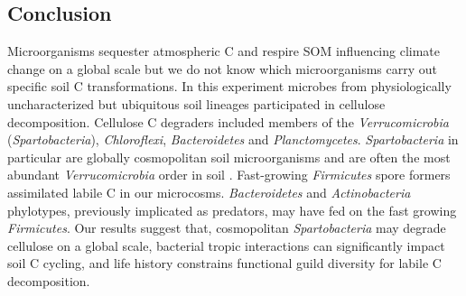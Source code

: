 \subsection{Conclusion} 
Microorganisms sequester atmospheric C and respire SOM influencing climate
change on a global scale but we do not know which microorganisms carry out
specific soil C transformations. In this experiment microbes from
physiologically uncharacterized but ubiquitous soil lineages participated in
cellulose decomposition. Cellulose C degraders included members of the
\textit{Verrucomicrobia} (\textit{Spartobacteria}), \textit{Chloroflexi},
\textit{Bacteroidetes} and \textit{Planctomycetes}. \textit{Spartobacteria} in
particular are globally cosmopolitan soil microorganisms and are often the most
abundant \textit{Verrucomicrobia} order in soil \citep{Bergmann_2011}.
Fast-growing \textit{Firmicutes} spore formers assimilated labile C in our
microcosms. \textit{Bacteroidetes} and \textit{Actinobacteria} phylotypes,
previously implicated as predators, may have fed on the fast growing
\textit{Firmicutes}. Our results suggest that, cosmopolitan
\textit{Spartobacteria} may degrade cellulose on a global scale, bacterial
tropic interactions can significantly impact soil C cycling, and life history
constrains functional guild diversity for labile C decomposition.

